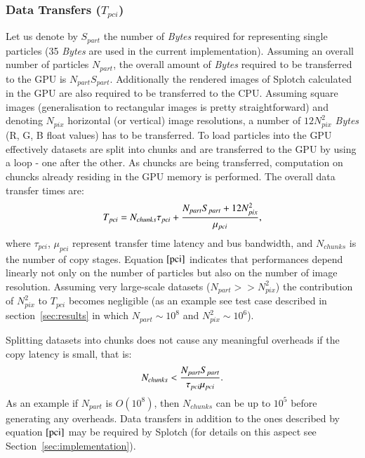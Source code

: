 \documentclass[1p]{elsarticle}
\begin{document}
\subsubsection{Data Transfers ($T_{pci}$)}
Let us denote by $S_{part}$ the number of \textit{Bytes} required for representing single particles (35 \textit{Bytes} are used in the current implementation). Assuming an overall number of particles $N_{part}$, the overall amount of \textit{Bytes} required to be transferred to the GPU is $N_{part} S_{part}$. Additionally the rendered images of Splotch calculated in the GPU are also required to be transferred to the CPU. Assuming square images (generalisation to rectangular images is pretty straightforward) and denoting $N_{pix}$ horizontal (or vertical) image resolutions, a number of $12 N_{pix}^2$ \textit{Bytes} (R, G, B float values) has to be transferred. To load particles into the GPU effectively datasets are split into chunks and are transferred to the GPU by using a loop - one after the other. As chuncks are being transferred, computation on chuncks already residing in the GPU memory is performed. The overall data transfer times are:
\begin{equation}\label{pci}
T_{pci} =  N_{chunks} \tau_{pci} + {N_{part} S_{part} + 12 N_{pix}^2 \over 
\mu_{pci}},
\end{equation}
where $\tau_{pci}$, $\mu_{pci}$ represent transfer time latency and bus bandwidth, and $N_{chunks}$ is the number of copy stages. Equation $\eqref{pci}$ indicates that performances depend linearly not only on the number of particles but also on the number of image resolution. Assuming very large-scale datasets ($N_{part} >> N_{pix}^2$) the contribution of $N_{pix}^2$ to $T_{pci}$ becomes negligible (as an example see test case described in section~\ref{sec:results} in which $N_{part} \sim 10^8$
and $N_{pix}^2 \sim 10^6$).

Splitting datasets into chunks does not cause any meaningful overheads if the copy latency is small, that is:
\begin{equation}
N_{chunks} < {N_{part} S_{part}\over \tau_{pci}\mu_{pci}}.
\end{equation}
As an example if $N_{part}$ is $O(10^8)$, then $N_{chunks}$ can be up to $10^5$ before
generating any overheads. Data transfers in addition to the ones described by equation $\eqref{pci}$ may be required by Splotch (for details on this aspect see Section~\ref{sec:implementation}).
\end{document}
